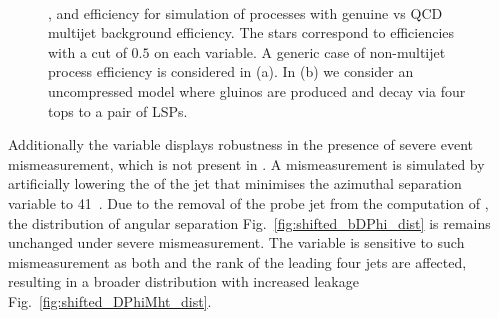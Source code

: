 \begin{figure}[!h]
 \centering
 ~
  \\
 \caption{\bdphi, \dphimhtj and \dphimhtjall efficiency for simulation of processes with genuine
 \met vs QCD multijet background efficiency. The stars correspond to
 efficiencies with a cut of $0.5$ on each variable. A generic case of
 non-multijet process efficiency is considered in (a). In (b) we
 consider an uncompressed \SUSY model where gluinos are produced and
 decay via four tops to a pair of \acp{LSP}. 
 }
 \label{fig:bDPhi_roc}
\end{figure}

Additionally the \bdphi variable displays robustness in the presence
of severe event mismeasurement, which is not present in \dphimhtj. A
mismeasurement is simulated by artificially lowering the \pt of the
jet that minimises the azimuthal separation variable to 41~\gev. Due
to the removal of the probe jet from the computation of \bdphi, the
distribution of angular separation Fig.~\ref{fig:shifted_bDPhi_dist}
is remains unchanged under severe mismeasurement. The \dphimhtj
variable is sensitive to such mismeasurement as both \mht and the rank
of the leading four jets are affected, resulting in a broader
distribution with increased leakage
Fig.~\ref{fig:shifted_DPhiMht_dist}.

